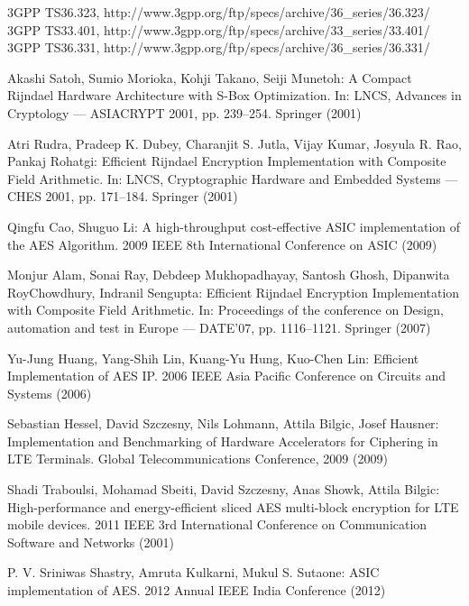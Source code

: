 \documentclass[lnicst,sechang,a4paper]{svmultln}
\begin{document}
\begin{thebibliography}{4}

 3GPP TS36.323, http://www.3gpp.org/ftp/specs/archive/36\_series/36.323/
 3GPP TS33.401, http://www.3gpp.org/ftp/specs/archive/33\_series/33.401/
 3GPP TS36.331, http://www.3gpp.org/ftp/specs/archive/36\_series/36.331/

 Akashi Satoh, Sumio Morioka, Kohji Takano, Seiji Munetoh: A Compact Rijndael Hardware Architecture with S-Box Optimization. In: LNCS, Advances in Cryptology — ASIACRYPT 2001, pp. 239--254. Springer (2001)


 Atri Rudra, Pradeep K. Dubey, Charanjit S. Jutla, Vijay Kumar, Josyula R. Rao, Pankaj Rohatgi: Efficient Rijndael Encryption Implementation with Composite Field Arithmetic. In: LNCS, Cryptographic Hardware and Embedded Systems — CHES 2001, pp. 171--184. Springer (2001)


 Qingfu Cao, Shuguo Li: A high-throughput cost-effective ASIC implementation of the AES Algorithm. 2009 IEEE 8th International Conference on ASIC (2009)


 Monjur Alam, Sonai Ray,	Debdeep Mukhopadhayay, Santosh Ghosh,  Dipanwita RoyChowdhury, Indranil Sengupta: Efficient Rijndael Encryption Implementation with Composite Field Arithmetic. In: Proceedings of the conference on Design, automation and test in Europe
 — DATE'07, pp. 1116--1121. Springer (2007)


 Yu-Jung Huang, Yang-Shih Lin,  Kuang-Yu Hung, Kuo-Chen Lin: Efficient Implementation of AES IP. 2006 IEEE Asia Pacific Conference on Circuits and Systems (2006)

 Sebastian Hessel, David Szczesny, Nils Lohmann, Attila Bilgic, Josef Hausner: Implementation and Benchmarking of Hardware Accelerators for Ciphering in LTE Terminals. Global Telecommunications Conference, 2009 (2009)

 Shadi Traboulsi, Mohamad Sbeiti, David Szczesny, Anas Showk, Attila Bilgic: High-performance and energy-efficient sliced AES multi-block encryption for LTE mobile devices. 2011 IEEE 3rd International Conference on Communication Software and Networks (2001)


 P. V. Sriniwas Shastry, Amruta Kulkarni, Mukul S. Sutaone: ASIC implementation of AES. 2012 Annual IEEE India Conference  (2012)


\end{thebibliography}
\end{document}
